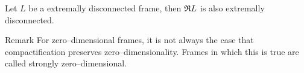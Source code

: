 \begin{proposition}\label{p:extrDiscPreserv}
    Let $L$ be a extremally disconnected frame, then $\mathfrak{R} L$ is also extremally disconnected.
\end{proposition}

\begin{blockProp}{Remark}
    For zero--dimensional frames, it is not always the case that compactification preserves zero--dimensionality. Frames in which this is true are called strongly zero--dimensional.
\end{blockProp}


